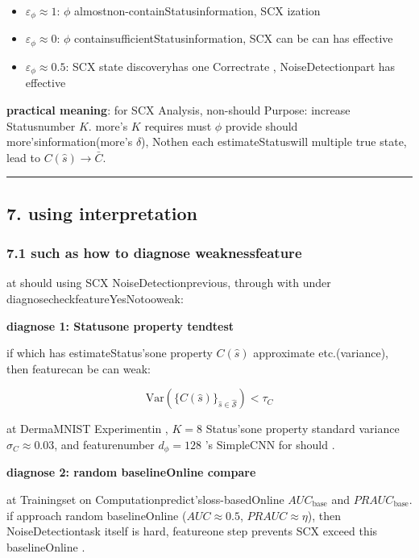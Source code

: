 \documentclass[
  12pt,
]{article}
\providecommand{\tightlist}{%
  \setlength{\itemsep}{0pt}\setlength{\parskip}{0pt}}
\begin{document}
\begin{itemize}
\tightlist
\item
  \(\varepsilon_\phi \approx 1\): \(\phi\) almostnon-containStatusinformation, SCX ization 
\item
  \(\varepsilon_\phi \approx 0\): \(\phi\) containsufficientStatusinformation, SCX
  can be can has effective
\item
  \(\varepsilon_\phi \approx 0.5\): SCX
  state discoveryhas one Correctrate , NoiseDetectionpart has effective
\end{itemize}

\textbf{practical meaning}: for  SCX Analysis, non-should Purpose: increase Statusnumber  \(K\). more's \(K\)
requires must  \(\phi\) provide should more'sinformation(more's
\(\delta\)), Nothen each estimateStatuswill multiple true state, lead to
\(C(\hat{s}) \to \bar{C}\). 

\begin{center}\rule{0.5\linewidth}{0.5pt}\end{center}

\subsection{7. using interpretation}\label{ux5b9eux7528ux89e3ux8bfb}

\subsubsection{7.1
such as how to diagnose weaknessfeature}\label{ux5982ux4f55ux8bcaux65adux5f31ux7279ux5f81}

at should using  SCX NoiseDetectionprevious, through with under diagnosecheckfeatureYesNotooweak: 

\textbf{diagnose 1: Statusone property tendtest}

if which has estimateStatus'sone property  \(C(\hat{s})\)
approximate etc.(variance), then featurecan be can weak: 

\[\text{Var}(\{C(\hat{s})\}_{\hat{s} \in \hat{\mathcal{S}}}) < \tau_C\]

at  DermaMNIST Experimentin , \(K=8\) Status'sone property standard variance
\(\sigma_C \approx 0.03\), and featurenumber  \(d_\phi = 128\) 's SimpleCNN
for should . 

\textbf{diagnose 2: random baselineOnline compare}

at Trainingset on Computationpredict'sloss-basedOnline  \(AUC_{\text{base}}\) and 
\(PRAUC_{\text{base}}\). if approach random baselineOnline (\(AUC \approx 0.5\),
\(PRAUC \approx \eta\)), then NoiseDetectiontask itself is hard, featureone step prevents SCX
exceed this baselineOnline . 
\end{document}

